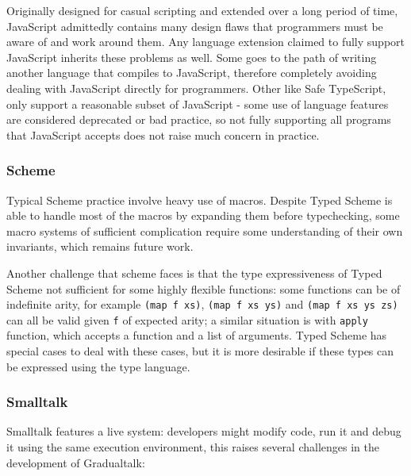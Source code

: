 Originally designed for casual scripting and extended over a long period of time,
JavaScript admittedly contains many design flaws that
programmers must be aware of and work around them.
Any language extension claimed to fully support JavaScript inherits these problems as well.
Some goes to the path of writing another language that compiles to JavaScript,
therefore completely avoiding dealing with JavaScript directly for programmers.
Other like Safe TypeScript, only support a reasonable subset of JavaScript -
some use of language features are considered deprecated or bad practice,
so not fully supporting all programs that JavaScript accepts does not raise
much concern in practice.

\subsubsection{Scheme}

Typical Scheme practice involve heavy use of macros.
Despite Typed Scheme is able to handle most of the macros by expanding them before typechecking,
some macro systems of sufficient complication require some understanding of their own invariants,
which remains future work.

Another challenge that scheme faces is that the type expressiveness of Typed Scheme
not sufficient for some highly flexible functions:
some functions can be of indefinite arity, for example \texttt{(map f xs)}, \texttt{(map f xs ys)}
and \texttt{(map f xs ys zs)} can all be valid given \texttt{f} of expected arity;
a similar situation is with \texttt{apply} function, which accepts a function and a list of arguments.
Typed Scheme has special cases to deal with these cases, but it is more desirable
if these types can be expressed using the type language.

\subsubsection{Smalltalk}

Smalltalk features a live system: developers might modify code, run it and debug it using the same execution environment, this raises several challenges in the development of Gradualtalk:

